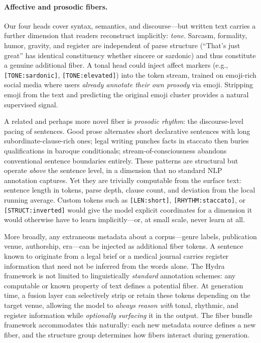 \documentclass[11pt]{article}
\begin{document}
\paragraph{Affective and prosodic fibers.}
Our four heads cover syntax, semantics, and discourse---but written text 
carries a further dimension that readers reconstruct implicitly: 
\emph{tone}. Sarcasm, formality, humor, gravity, and register are 
independent of parse structure (``That's just great'' has identical 
constituency whether sincere or sardonic) and thus constitute a genuine 
additional fiber. A tonal head could inject affect markers 
(e.g., \texttt{[TONE:sardonic]}, \texttt{[TONE:elevated]}) into the 
token stream, trained on emoji-rich social media where users 
\emph{already annotate their own prosody} via emoji. Stripping 
emoji from the text and predicting the original emoji cluster 
provides a natural supervised signal.

A related and perhaps more novel fiber is \emph{prosodic rhythm}: the 
discourse-level pacing of sentences. Good prose alternates short 
declarative sentences with long subordinate-clause-rich ones; legal 
writing punches facts in staccato then buries qualifications in 
baroque conditionals; stream-of-consciousness abandons conventional 
sentence boundaries entirely. These patterns are structural but 
operate \emph{above} the sentence level, in a dimension that no 
standard NLP annotation captures. Yet they are trivially computable 
from the surface text: sentence length in tokens, parse depth, 
clause count, and deviation from the local running average. Custom 
tokens such as \texttt{[LEN:short]}, \texttt{[RHYTHM:staccato]}, or 
\texttt{[STRUCT:inverted]} would give the model explicit coordinates 
for a dimension it would otherwise have to learn implicitly---or, at 
small scale, never learn at all.

More broadly, any extraneous metadata about a corpus---genre labels, 
publication venue, authorship, era---can be injected as additional 
fiber tokens. A sentence known to originate from a legal brief or 
a medical journal carries register information that need not be 
inferred from the words alone. The Hydra framework is not limited to 
linguistically \emph{standard} annotation schemes: any computable or 
known property of text defines a potential fiber. At generation time, 
a fusion layer can selectively strip or retain these tokens depending 
on the target venue, allowing the model to \emph{always reason with} 
tonal, rhythmic, and register information while \emph{optionally 
surfacing} it in the output. The fiber bundle framework accommodates 
this naturally: each new metadata source defines a new fiber, and 
the structure group determines how fibers interact during generation.
\end{document}
